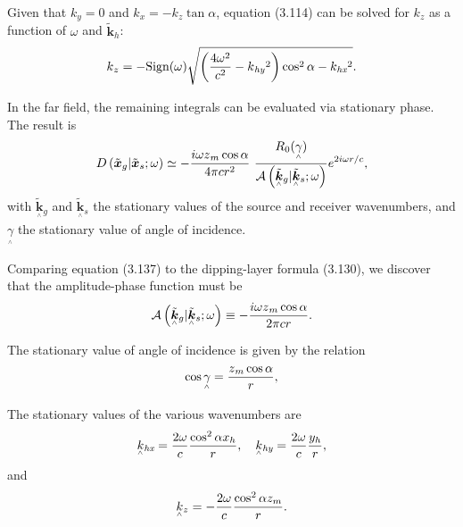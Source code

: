 Given that \(k_y=0\) and \(k_x=-k_z\tan  \alpha \), equation (3.114) can be solved for \(k_z\) as a function of $\omega $ and \(\tilde{\boldsymbol{k}}_h\):
\begin{equation}\text{\textit{$k$}}_{\text{\textit{$z$}}}=- \text{Sign}(\omega ) \sqrt{\left(\frac{4\omega ^2}{\text{\textit{$c$}}^2}-\text{\textit{$k$}}_{\text{\textit{hy}}}{}^2\right)\cos
^2\alpha -\text{\textit{$k_{\text{hx}}$}}{}^2} .\end{equation}

In the far field, the remaining integrals can be evaluated via stationary phase. The result is
\begin{equation}\text{\textit{$D$}}\left(\tilde{\boldsymbol{x}}_g|\tilde{\boldsymbol{x}}_s;\omega
\right) \simeq - \frac{i \omega  \text{\textit{$z$}}_{\text{\textit{$m$}}}\cos  \alpha }{4\pi \text{\textit{$c$}}\text{\textit{$ $}}\text{\textit{$r
$}}^2}\text{  }\frac{\text{\textit{$R$}}_0(\underset{{}^{\wedge}}{\gamma })}{\mathcal{A}\left(
\text{\textit{$\underset{{}^{\wedge}}{\tilde{\boldsymbol{k}}}$}}{}_{\text{\textit{$g$}}}|
\text{\textit{$\underset{{}^{\wedge}}{\tilde{\boldsymbol{k}}}$}}{}_{\text{\textit{$s$}}};\omega
\right)}e^{2i \omega  \text{\textit{$r/c$}}},\end{equation}
with \(\underset{{}^{\wedge}}{\tilde{\boldsymbol{k}}}{}_g\) and \(\underset{{}^{\wedge}}{\tilde{\boldsymbol{k}}}{}_s\) the stationary
values of the source and receiver wavenumbers, and \(\underset{{}^{\wedge}}{\gamma }\) the stationary value of angle of incidence.

Comparing equation (3.137) to the dipping-layer formula (3.130), we discover that the amplitude-phase function must be
\begin{equation} \mathcal{A}\left(\underset{{}^{\wedge}}{\tilde{\boldsymbol{k}}}{}_g|\underset{{}^{\wedge}}{\tilde{\boldsymbol{k}}}{}_s;\omega \right) \equiv - \frac{i \omega
\text{\textit{$z$}}_{\text{\textit{$m$}}}\cos  \alpha }{2\pi  \text{\textit{$c$}}\text{\textit{$ $}}\text{\textit{$r$}}\text{\textit{$ $}}}.\end{equation}

The stationary value of angle of incidence is given by the relation
\begin{equation}\cos  \underset{{}^{\wedge}}{\gamma }=\frac{\text{\textit{$z$}}_{\text{\textit{$m$}}}\cos  \alpha }{\text{\textit{$r$}}},\end{equation}

The stationary values of the various wavenumbers are
\begin{equation}\text{\textit{$\underset{{}^{\wedge}}{k}{}_{\text{hx}}$}}=\frac{2\omega }{\text{\textit{$c$}}}\frac{\cos ^2\text{\textit{$ $}}\alpha
 \text{\textit{$x_h$}}}{\text{\textit{$r$}}},\quad\text{\textit{$\underset{{}^{\wedge}}{k}{}_{\text{hy}}$}}=\frac{2\omega }{\text{\textit{$c$}}}\frac{\text{\textit{$y_h$}}}{\text{\textit{$r$}}},\end{equation}
and
\begin{equation}\text{\textit{$\underset{{}^{\wedge}}{k}{}_z$}}=-\frac{2\omega }{\text{\textit{$c$}}}\frac{\cos ^2 \alpha  \text{\textit{$z_m$}}}{\text{\textit{$r$}}}.\end{equation}

